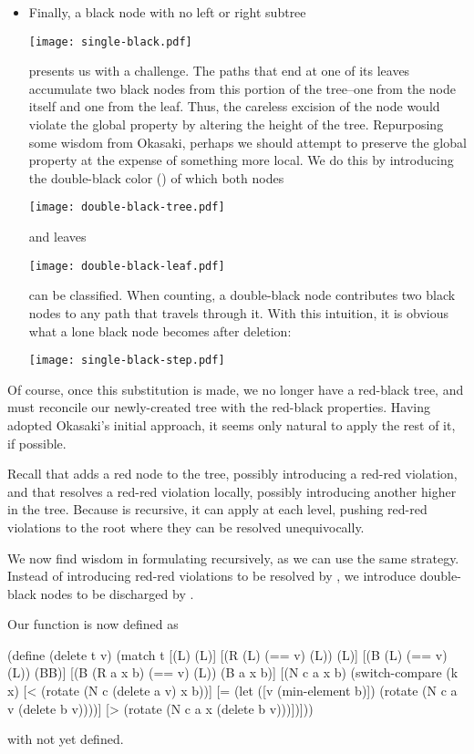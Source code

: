 \documentclass[preprint]{sigplanconf}
\begin{document}
\begin{itemize}
\item Finally, a black node with no left or right subtree
\begin{center}
\texttt{[image: single-black.pdf]}
\end{center}
presents us with a challenge. The paths that end at one of its leaves accumulate
two black nodes from this portion of the tree--one from the node itself and one
from the leaf. Thus, the careless excision of the node would violate the global
property by altering the height of the tree. Repurposing some wisdom from
Okasaki, perhaps we should attempt to preserve the global property at the
expense of something more local. We do this by introducing the double-black
color () of which both nodes
\begin{center}
\texttt{[image: double-black-tree.pdf]}
\end{center}
and leaves
\begin{center}
\texttt{[image: double-black-leaf.pdf]}
\end{center}
can be classified. When counting, a double-black node contributes two black
nodes to any path that travels through it. With this intuition, it is obvious
what a lone black node becomes after deletion:
\begin{center}
\texttt{[image: single-black-step.pdf]}
\end{center}

\end{itemize}

Of course, once this substitution is made, we no longer have a red-black tree,
and must reconcile our newly-created tree with the red-black properties. Having
adopted Okasaki's initial approach, it seems only natural to apply the rest of
it, if possible.

Recall that  adds a red node to the tree, possibly introducing a
red-red violation, and that  resolves a red-red violation
locally, possibly introducing another higher in the tree. Because
 is recursive, it can apply  at each level,
pushing red-red violations to the root where they can be resolved unequivocally.

We now find wisdom in formulating  recursively, as we can use the
same strategy. Instead of introducing red-red violations to be resolved by
, we introduce double-black nodes to be discharged by
.

Our  function is now defined as
\begin{schemedisplay}
(define (delete t v)
  (match t
    [(L) (L)]
    [(R (L) (== v) (L)) (L)]
    [(B (L) (== v) (L)) (BB)]
    [(B (R a x b) (== v) (L)) (B a x b)]
    [(N c a x b)
     (switch-compare
       (k x)
       [< (rotate (N c (delete a v) x b))]
       [= (let ([v (min-element b)])
            (rotate (N c a v (delete b v))))]
       [> (rotate (N c a x (delete b v)))])]))
\end{schemedisplay}
with  not yet defined.
\end{document}
